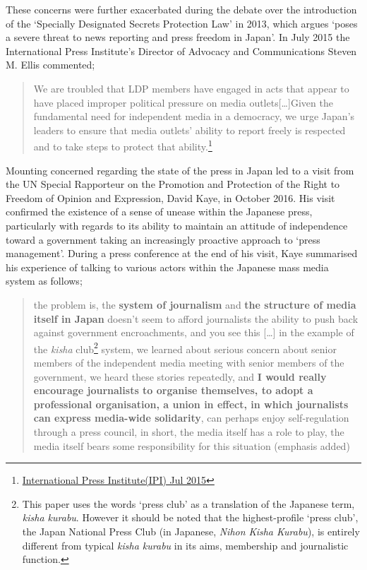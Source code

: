 \documentclass[11pt, headings=normal]{scrartcl}
\begin{document}
These concerns were further exacerbated during the debate over the
introduction of the `Specially Designated Secrets Protection Law' in
2013, which \textcite[1]{Repeta:2014} argues `poses a severe threat to
news reporting and press freedom in Japan'. In July 2015 the
International Press Institute's Director of Advocacy and Communications
Steven M. Ellis commented;

\begin{quote}
We are troubled that LDP members have engaged in acts that appear to
have placed improper political pressure on media
outlets{[}\ldots{}{]}Given the fundamental need for independent media in
a democracy, we urge Japan's leaders to ensure that media outlets'
ability to report freely is respected and to take steps to protect that
ability.\footnote{\href{https://ipi.media/pressure-on-japanese-media-raises-concerns/}{International
  Press Institute(IPI) Jul 2015}}
\end{quote}

Mounting concerned regarding the state of the press in Japan led to a
visit from the UN Special Rapporteur on the Promotion and Protection of
the Right to Freedom of Opinion and Expression, David Kaye, in October
2016. His visit confirmed the existence of a sense of unease within the
Japanese press, particularly with regards to its ability to maintain an
attitude of independence toward a government taking an increasingly
proactive approach to `press management'. During a press conference at
the end of his visit, Kaye summarised his experience of talking to
various actors within the Japanese mass media system as follows;

\begin{quote}
the problem is, the \textbf{system of journalism} and \textbf{the
structure of media itself in Japan} doesn't seem to afford journalists
the ability to push back against government encroachments, and you see
this {[}\ldots{}{]} in the example of the \emph{kisha} club\footnote{This
  paper uses the words `press club' as a translation of the Japanese
  term, \emph{kisha kurabu}. However it should be noted that the
  highest-profile `press club', the Japan National Press Club (in
  Japanese, \emph{Nihon Kisha Kurabu}), is entirely different from
  typical \emph{kisha kurabu} in its aims, membership and journalistic
  function.} system, we learned about serious concern about senior
members of the independent media meeting with senior members of the
government, we heard these stories repeatedly, and \textbf{I would
really encourage journalists to organise themselves, to adopt a
professional organisation, a union in effect, in which journalists can
express media-wide solidarity}, can perhaps enjoy self-regulation
through a press council, in short, the media itself has a role to play,
the media itself bears some responsibility for this situation (emphasis
added)
\end{quote}
\end{document}
